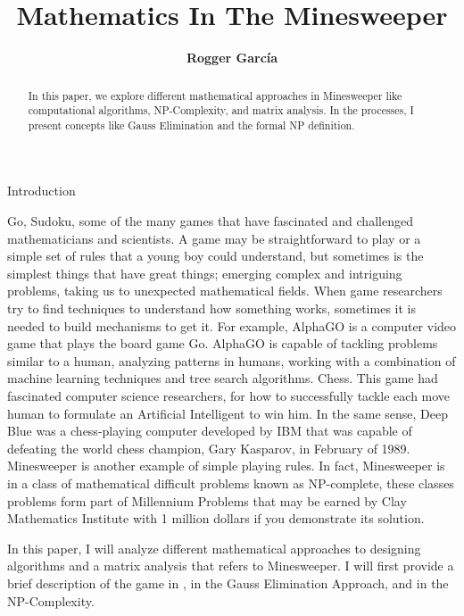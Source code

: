 \documentclass[a4paper]{article}
\title{\textbf{Mathematics In The Minesweeper}}
\author{\textbf{Rogger García}}
\numberwithin{equation}{subsection}
\begin{document}
\maketitle

\begin{abstract}
In this paper, we explore different mathematical approaches in Minesweeper like computational algorithms, NP-Complexity, and matrix analysis. In the processes, I present concepts like Gauss Elimination and the formal NP definition. 
\end{abstract}


{\huge Introduction}



\vspace{5mm} %

Go, Sudoku, some of the many games that have fascinated and challenged mathematicians and scientists.  A game may be straightforward to play or a simple set of rules that a young boy could understand, but sometimes is the simplest things that have great things; emerging complex and intriguing problems, taking us to unexpected mathematical fields.
When game researchers try to find techniques to understand how something works, sometimes it is needed to build mechanisms to get it. For example, AlphaGO is a computer video game that plays the board game Go.  AlphaGO is capable of tackling problems similar to a human, analyzing patterns in humans, working with a combination of machine learning techniques and tree search algorithms.
Chess. This game had fascinated computer science researchers, for how to successfully tackle each move human to formulate an Artificial Intelligent to win him. In the same sense, Deep Blue was a chess-playing computer developed by IBM that was capable of defeating the world chess champion, Gary Kasparov, in February of 1989.
Minesweeper is another example of simple playing rules. In fact,  Minesweeper is in a class of mathematical difficult problems known as NP-complete, these classes problems form part of Millennium Problems that may be earned by Clay Mathematics Institute with 1 million dollars if you demonstrate its solution.


\vspace{5mm} %
In this paper, I will analyze different mathematical approaches to designing algorithms and a matrix analysis that refers to Minesweeper. I will first provide a brief description of the game in , in the  Gauss Elimination Approach, and in the    NP-Complexity.
\end{document}
